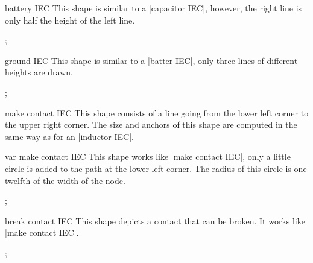 \begin{shape}{battery IEC}
    This shape is similar to a |capacitor IEC|, however, the right line is only
    half the height of the left line.
\begin{codeexample}[preamble={\usetikzlibrary{circuits.ee.IEC}}]
\tikz \node[shape=battery IEC,shape example,minimum size=2cm,
            inner sep=0pt] {};
\end{codeexample}
\end{shape}

\begin{shape}{ground IEC}
    This shape is similar to a |batter IEC|, only three lines of different
    heights are drawn.
\begin{codeexample}[preamble={\usetikzlibrary{circuits.ee.IEC}}]
\tikz \node[shape=ground IEC,shape example,minimum size=2cm,
            inner sep=0pt] {};
\end{codeexample}
\end{shape}

\begin{shape}{make contact IEC}
    This shape consists of a line going from the lower left corner to the upper
    right corner. The size and anchors of this shape are computed in the same
    way as for an |inductor IEC|.
\begin{codeexample}[preamble={\usetikzlibrary{circuits.ee.IEC}}]
\end{codeexample}
\end{shape}

\begin{shape}{var make contact IEC}
    This shape works like |make contact IEC|, only a little circle is added to
    the path at the lower left corner. The radius of this circle is one twelfth
    of the width of the node.
\begin{codeexample}[preamble={\usetikzlibrary{circuits.ee.IEC}}]
\tikz \node[shape=var make contact IEC,shape example,
            minimum height=1cm,minimum width=3cm,inner sep=0pt] {};
\end{codeexample}
\end{shape}

\begin{shape}{break contact IEC}
    This shape depicts a contact that can be broken. It works like
    |make contact IEC|.
\begin{codeexample}[preamble={\usetikzlibrary{circuits.ee.IEC}}]
\tikz \node[shape=break contact IEC,shape example,
            minimum height=1cm,minimum width=3cm,inner sep=0pt] {};
\end{codeexample}
\end{shape}
